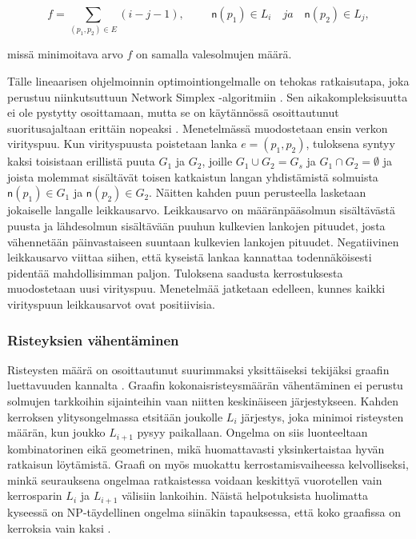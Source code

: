 \documentclass[finnish,12pt]{article}
\begin{document}
\begin{equation}
f=\displaystyle\sum\limits_{(p_1 ,p_2) \in E} (i - j - 1), \hspace{1cm}
\mathsf{n}(p_1) \in L_i \quad ja \quad \mathsf{n}(p_2) \in L_j,
\end{equation}

missä minimoitava arvo $f$ on samalla valesolmujen määrä.

Tälle lineaarisen ohjelmoinnin optimointiongelmalle on tehokas ratkaisutapa, joka perustuu niinkutsuttuun Network Simplex -algoritmiin \cite{RefWorks:71}.
Sen aikakompleksisuutta ei ole pystytty osoittamaan, mutta se on käytännössä osoittautunut suoritusajaltaan erittäin nopeaksi  \cite{RefWorks:28}.
Menetelmässä muodostetaan ensin verkon virityspuu.
Kun virityspuusta poistetaan lanka $e=(p_1, p_2)$, tuloksena syntyy kaksi toisistaan erillistä puuta $G_1$ ja $G_2$, joille $G_1 \cup G_2 = G_s$ ja $G_1 \cap G_2 = \emptyset$ ja joista molemmat sisältävät toisen katkaistun langan yhdistämistä solmuista $\mathsf{n}(p_1) \in G_1$ ja $\mathsf{n}(p_2) \in G_2$.
Näitten kahden puun perusteella lasketaan jokaiselle langalle leikkausarvo.
Leikkausarvo on määränpääsolmun sisältävästä puusta ja lähdesolmun sisältävään puuhun kulkevien lankojen pituudet,
josta vähennetään päinvastaiseen suuntaan kulkevien lankojen pituudet.
Negatiivinen leikkausarvo viittaa siihen, että kyseistä lankaa kannattaa todennäköisesti pidentää mahdollisimman paljon.
Tuloksena saadusta kerrostuksesta muodostetaan uusi virityspuu. Menetelmää jatketaan edelleen, kunnes kaikki virityspuun leikkausarvot ovat positiivisia.


		\subsubsection{Risteyksien vähentäminen}

Risteysten määrä on osoittautunut suurimmaksi yksittäiseksi tekijäksi graafin luettavuuden kannalta \cite{RefWorks:47}. 
Graafin kokonaisristeysmäärän vähentäminen ei perustu solmujen tarkkoihin sijainteihin vaan niitten keskinäiseen järjestykseen.
Kahden kerroksen ylitysongelmassa etsitään joukolle $L_i$ järjestys, joka minimoi risteysten määrän, kun joukko $L_{i+1}$ pysyy paikallaan.
Ongelma on siis luonteeltaan kombinatorinen eikä geometrinen, mikä huomattavasti yksinkertaistaa hyvän ratkaisun löytämistä.
Graafi on myös muokattu kerrostamisvaiheessa kelvolliseksi, minkä seurauksena ongelmaa ratkaistessa voidaan keskittyä vuorotellen vain kerrosparin $L_i$ ja $L_{i+1}$ välisiin lankoihin.
Näistä helpotuksista huolimatta kyseessä on NP-täydellinen ongelma siinäkin tapauksessa, että koko graafissa on kerroksia vain kaksi \cite{RefWorks:40}.
\end{document}
